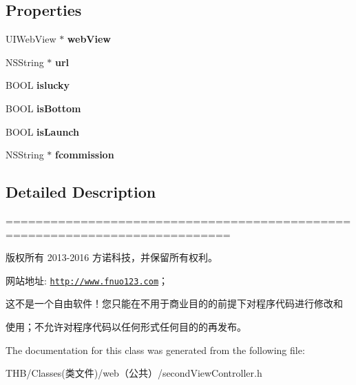 \subsection*{Properties}
\begin{DoxyCompactItemize}
\item 
\mbox{\label{interfacesecond_view_controller_a678c898a5b06d1f0a02e651ded0ccbbc}} 
U\+I\+Web\+View $\ast$ {\bfseries web\+View}
\item 
\mbox{\label{interfacesecond_view_controller_a51778248bc67e4ee1792c78ac53e5b7c}} 
N\+S\+String $\ast$ {\bfseries url}
\item 
\mbox{\label{interfacesecond_view_controller_ab12d736b86d6c0a78417123c44e5d82f}} 
B\+O\+OL {\bfseries islucky}
\item 
\mbox{\label{interfacesecond_view_controller_a4504f1f48d107c45ddfd1ca4eb7541ee}} 
B\+O\+OL {\bfseries is\+Bottom}
\item 
\mbox{\label{interfacesecond_view_controller_a2583d18fbac8813edafee18076ee8c7b}} 
B\+O\+OL {\bfseries is\+Launch}
\item 
\mbox{\label{interfacesecond_view_controller_af8514f4d2be1a09e54c44bf07adc385a}} 
N\+S\+String $\ast$ {\bfseries fcommission}
\end{DoxyCompactItemize}


\subsection{Detailed Description}
============================================================================

版权所有 2013-\/2016 方诺科技，并保留所有权利。

网站地址\+: \href{http://www.fnuo123.com}{\tt http\+://www.\+fnuo123.\+com}； 



这不是一个自由软件！您只能在不用于商业目的的前提下对程序代码进行修改和

使用；不允许对程序代码以任何形式任何目的的再发布。 

 

The documentation for this class was generated from the following file\+:\begin{DoxyCompactItemize}
\item 
T\+H\+B/\+Classes(类文件)/web（公共）/second\+View\+Controller.\+h\end{DoxyCompactItemize}
